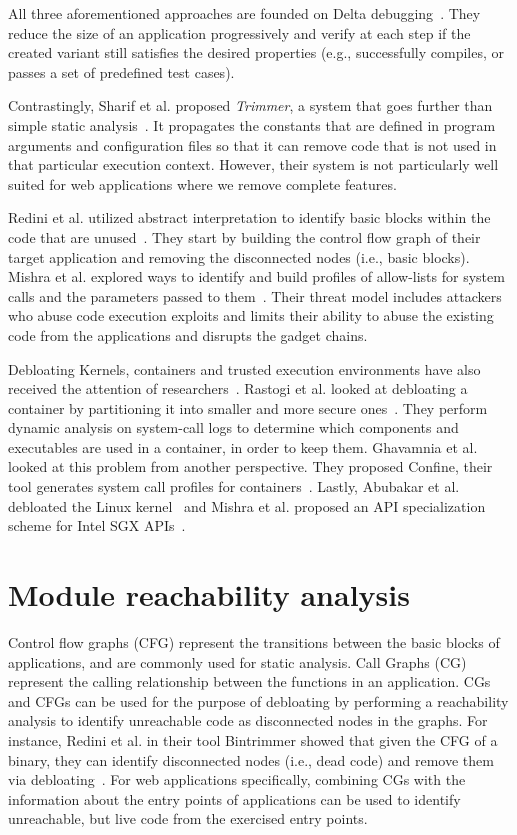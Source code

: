 All three aforementioned approaches are founded on Delta debugging~\cite{zeller2002Delta}.
They reduce the size of an application progressively and verify at each step if the created variant still satisfies the desired properties (e.g., successfully compiles, or passes a set of predefined test cases).

Contrastingly, Sharif et al. proposed \textit{Trimmer}, a system that goes further than simple static analysis~\cite{sharif2018Trimmer}.
It propagates the constants that are defined in program arguments and configuration files so that it can remove code that is not used in that particular execution context.
However, their system is not particularly well suited for web applications where we remove complete features.

Redini et al. utilized abstract interpretation to identify basic blocks within the code that are unused~\cite{redini2019b}. 
They start by building the control flow graph of their target application and removing the disconnected nodes (i.e., basic blocks). 
Mishra et al. explored ways to identify and build profiles of allow-lists for system calls and the parameters passed to them~\cite{mishra2018shredder,mishra2020saffire}. 
Their threat model includes attackers who abuse code execution exploits and limits their ability to abuse the existing code from the applications and disrupts the gadget chains. 

Debloating Kernels, containers and trusted execution environments have also received the attention of researchers~\cite{abubakar2021shard,mishra2021sgxpecial}. 
Rastogi et al. looked at debloating a container by partitioning it into smaller and more secure ones~\cite{rastogi2017Cimplifier}. They perform dynamic analysis on system-call logs to determine which components and executables are used in a container, in order to keep them. 
Ghavamnia et al. looked at this problem from another perspective. 
They proposed Confine, their tool generates system call profiles for containers~\cite{259711}.
Lastly, Abubakar et al. debloated the Linux kernel~\cite{abubakar2021shard} and Mishra et al. proposed an API specialization scheme for Intel SGX APIs~\cite{mishra2021sgxpecial}.

\section{Module reachability analysis}

Control flow graphs (CFG) represent the transitions between the basic blocks of applications, and are commonly used for static analysis. 
Call Graphs (CG) represent the calling relationship between the functions in an application. 
CGs and CFGs can be used for the purpose of debloating by performing a reachability analysis to identify unreachable code as disconnected nodes in the graphs. 
For instance, Redini et al. in their tool Bintrimmer showed that given the CFG of a binary, they can identify disconnected nodes (i.e., dead code) and remove them via debloating~\cite{redini2019b}. 
For web applications specifically, combining CGs with the information about the entry points of applications can be used to identify unreachable, but live code from the exercised entry points. 

